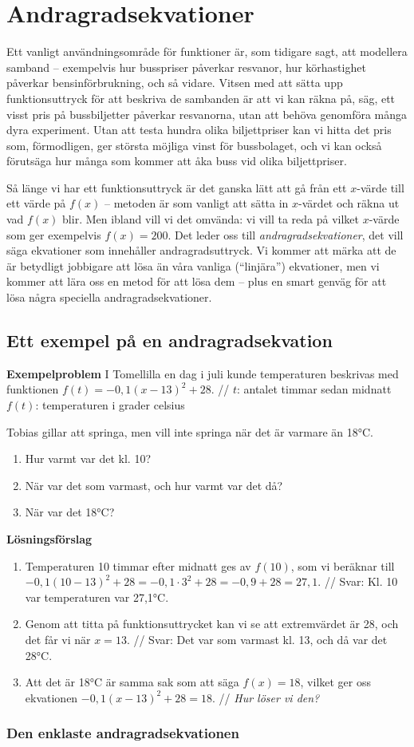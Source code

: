 \section{Andragradsekvationer}

Ett vanligt användningsområde för funktioner är, som tidigare sagt, att modellera samband -- exempelvis hur busspriser påverkar resvanor, hur körhastighet påverkar bensinförbrukning, och så vidare.
Vitsen med att sätta upp funktionsuttryck för att beskriva de sambanden är att vi kan räkna på, säg, ett visst pris på bussbiljetter påverkar resvanorna, utan att behöva genomföra många dyra experiment.
Utan att testa hundra olika biljettpriser kan vi hitta det pris som, förmodligen, ger största möjliga vinst för bussbolaget, och vi kan också förutsäga hur många som kommer att åka buss vid olika biljettpriser.

Så länge vi har ett funktionsuttryck är det ganska lätt att gå från ett $x$-värde till ett värde på $f(x)$ -- metoden är som vanligt att sätta in $x$-värdet och räkna ut vad $f(x)$ blir.
Men ibland vill vi det omvända: vi vill ta reda på vilket $x$-värde som ger exempelvis $f(x)=200$.
Det leder oss till \emph{andragradsekvationer}, det vill säga ekvationer som innehåller andragradsuttryck.
Vi kommer att märka att de är betydligt jobbigare att lösa än våra vanliga (``linjära'') ekvationer, men vi kommer att lära oss en metod för att lösa dem -- plus en smart genväg för att lösa några speciella andragradsekvationer.

\subsection{Ett exempel på en andragradsekvation}

\textbf{Exempelproblem}
I Tomellilla en dag i juli kunde temperaturen beskrivas med funktionen $f(t) = -0,1(x-13)^2+28$. //
$t$: antalet timmar sedan midnatt
$f(t)$: temperaturen i grader celsius

Tobias gillar att springa, men vill inte springa när det är varmare än 18°C.

\begin{enumerate}[label=\Alph*]
  \item Hur varmt var det kl. 10?
  \item När var det som varmast, och hur varmt var det då?
  \item När var det 18°C?
\end{enumerate}

\textbf{Lösningsförslag}
\begin{enumerate}[label=\Alph*]
  \item Temperaturen 10 timmar efter midnatt ges av $f(10)$, som vi beräknar till $-0,1(10-13)^2+28 = -0,1 \cdot 3^2 + 28 = -0,9+28 = 27,1$. //
  Svar: Kl. 10 var temperaturen var 27,1°C.
  \item Genom att titta på funktionsuttrycket kan vi se att extremvärdet är 28, och det får vi när $x=13$. //
  Svar: Det var som varmast kl. 13, och då var det 28°C.
  \item Att det är 18°C är samma sak som att säga $f(x)=18$, vilket ger oss ekvationen $-0,1(x-13)^2+28=18$. //
  \emph{Hur löser vi den?}
\end{enumerate}

\subsubsection{Den enklaste andragradsekvationen}

